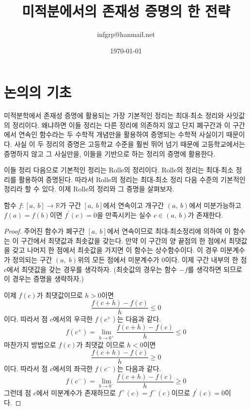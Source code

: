 \documentclass[a4paper]{article}
\title{미적분에서의 존재성 증명의 한 전략}
\author{infgrp@hanmail.net}
\date{\today}
\begin{document}
\maketitle



\section{논의의 기초}

    미적분학에서 존재성 증명에 활용되는 가장 기본적인 정리는 최대-최소 정리와 사잇값의 정리이다. 왜냐하면 이들 정리는 다른 정리에 의존하지 않고 단지 폐구간과 이 구간에서 연속인 함수라는 두 수학적 개념만을 활용하여 증명되는 수학적 사실이기 때문이다. 사실 이 두 정리의 증명은 고등학교 수준을 훨씬 뛰어 넘기 때문에 고등학교에서는 증명하지 않고 그 사실만을, 이들을 기반으로 하는 정리의 증명에 활용한다. 
    
    이들 정리 다음으로 기본적인 정리는 Rolle의 정리이다. Rolle의 정리는 최대-최소 정리를 활용하여 증명된다. 따라서 Rolle의 정리는 최대-최소 정리 다음 수준의 기본적인 정리라 할 수 있다. 이제 Rolle의 정리와 그 증명을 살펴보자. 
\vspace{1em}
\begin{theorem}[Rolle의 정리]
함수 $f:[a,\: b]\to\mathbb{R}$가 구간 $[a,\: b]$에서 연속이고 개구간 $(a,\: b)$에서 미분가능하고
 $f(a)=f(b)$이면 $f^{\prime}(c)=0$을 만족시키는 실수 $c \in(a,\: b)$가 존재한다.
\begin{proof}
 주어진 함수가 폐구간 $[a,\: b]$에서 연속이므로 최대-최소정리에 의하여 이 함수는 이 구간에서 최댓값과 최솟값을 갖는다. 만약 이 구간의 양 끝점의 한 점에서 최댓값을 갖고 나머지 한 점에서 최솟값을 가지면 이 함수는 상수함수이다. 이 경우 미분계수가 정의되는 구간 $(a, \;b)$위의 모든 점에서 미분계수가 $0$이다. 이제 구간 내부의 한 점 $c$에서 최댓값을 갖는 경우를 생각하자. (최솟값의 경우는 함수 $-f$를 생각하면 되므로 이 경우는 증명을 생략하자.) 

이제 $f(c)$가 최댓값이므로  $h>0$이면 
\[
\frac{f(c+h)-f(c)}{h} \le 0
\]
이다. 따라서 점 $c$에서의 우극한 $f(c^{+})$는 다음과 같다.
\[
f(c^{+}) = \lim\limits_{h \to 0^{+}} \frac{f(c+h)-f(c)}{h} \le 0
\]
마찬가지 방법으로 $f(c)$가 최댓값 이므로  $h<0$이면 
\[
\frac{f(c+h)-f(c)}{h} \ge 0
\]
이다. 따라서 점 $c$에서의 좌극한 $f(c^{-})$는 다음과 같다.
\[
f(c^{-}) = \lim\limits_{h \to 0^{-}} \frac{f(c+h)-f(c)}{h} \ge 0
\]
그런데 점 $c$에서 미분계수가 존재하므로 $f^{+}(c)= f^{-}(c)$이므로 $f^{\prime}(c)=0$이다.
\end{proof}
\end{theorem}
\vspace{1em}
\end{document}
